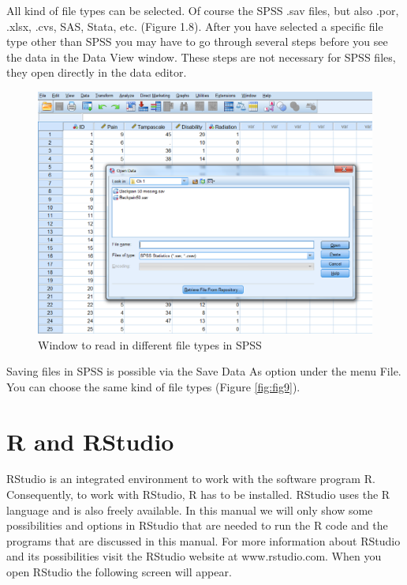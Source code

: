 \documentclass[]{book}
\theoremstyle{definition}
\theoremstyle{definition}
\theoremstyle{definition}
\theoremstyle{remark}
\begin{document}
All kind of file types can be selected. Of course the SPSS .sav files,
but also .por, .xlsx, .cvs, SAS, Stata, etc. (Figure 1.8). After you
have selected a specific file type other than SPSS you may have to go
through several steps before you see the data in the Data View window.
These steps are not necessary for SPSS files, they open directly in the
data editor.

\begin{figure}

{\centering \includegraphics[width=0.9\linewidth]{images/fig1.8} 

}

\caption{Window to read in different file types in SPSS}\label{fig:fig8}
\end{figure}

Saving files in SPSS is possible via the Save Data As option under the
menu File. You can choose the same kind of file types (Figure
\ref{fig:fig9}).

\section{R and RStudio}\label{r-and-rstudio}

RStudio is an integrated environment to work with the software program
R. Consequently, to work with RStudio, R has to be installed. RStudio
uses the R language and is also freely available. In this manual we will
only show some possibilities and options in RStudio that are needed to
run the R code and the programs that are discussed in this manual. For
more information about RStudio and its possibilities visit the RStudio
website at www.rstudio.com. When you open RStudio the following screen
will appear.
\end{document}
